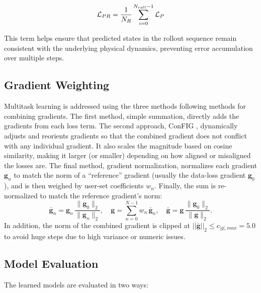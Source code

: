 \begin{equation}
    \textcolor{black}{\mathcal{L}_{PR} = \frac{1}{N_{R}} \sum_{i=0}^{N_{roll}-1} \mathcal{L}_P}
\end{equation}

This term helps ensure that predicted states in the rollout sequence remain consistent with the underlying physical dynamics, preventing error accumulation over multiple steps.


\subsection{Gradient Weighting}
\label{sec:grad_weighting}
Multitask learning is addressed using the three methods following methods for combining gradients. The first method, simple summation, directly adds the gradients from each loss term. The second approach, ConFIG \cite{liu_config_2024}, dynamically adjusts and reorients gradients so that the combined gradient does not conflict with any individual gradient. It also scales the magnitude based on cosine similarity, making it larger (or smaller) depending on how aligned or misaligned the losses are. The final method, gradient normalization, normalizes each gradient $\mathbf{g}_n$ to match the norm of a “reference” gradient (usually the data-loss gradient $\mathbf{g}_0$), and is then weighed by user-set coefficients $w_n$. Finally, the sum is re-normalized to match the reference gradient’s norm:
    \begin{equation}
    \label{eq:grad_norm_scaling}
        \bar{\mathbf{g}}_n
        =
        \mathbf{g}_n\,
        \frac{\|\mathbf{g}_0\|_2}{\|\mathbf{g}_n\|_2},
        \quad
        \mathbf{g}
        =
        \sum_{n=0}^{N-1} w_n\,\bar{\mathbf{g}}_n,
        \quad
        \bar{\mathbf{g}}
        =
        \mathbf{g}\,
        \frac{\|\mathbf{g}_0\|_2}{\|\mathbf{g}\|_2}.
    \end{equation}
In addition, the norm of the combined gradient is clipped at $||\bar{\mathbf{g}}||_2\leq c_{|g|,max}=5.0$ to avoid huge steps due to high variance or numeric issues.

\subsection{Model Evaluation}
\label{sec:model_eval}
The learned models are evaluated in two ways:
